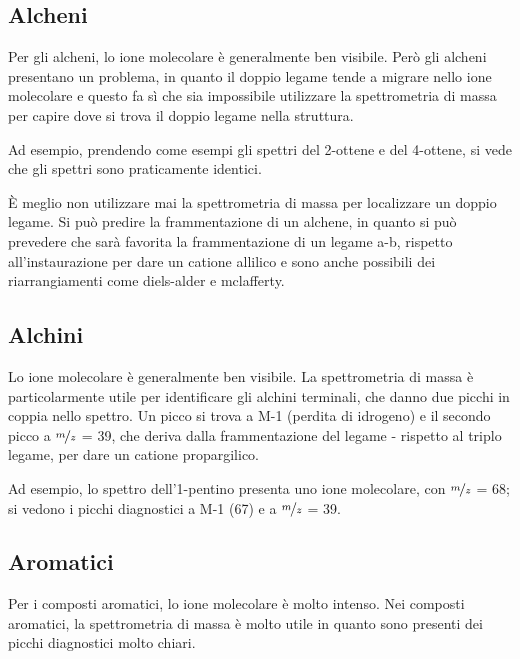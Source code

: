 \subsection{Alcheni}

Per gli alcheni, lo ione molecolare è generalmente ben visibile. Però
gli alcheni presentano un problema, in quanto il doppio legame tende a
migrare nello ione molecolare e questo fa sì che sia impossibile
utilizzare la spettrometria di massa per capire dove si trova il doppio
legame nella struttura.

Ad esempio, prendendo come esempi gli spettri del 2-ottene e del
4-ottene, si vede che gli spettri sono praticamente identici.

È meglio non utilizzare mai la spettrometria di massa per localizzare un
doppio legame. Si può predire la frammentazione di un alchene, in quanto
si può prevedere che sarà favorita la frammentazione di un legame a-b,
rispetto all'instaurazione per dare un catione allilico e sono anche
possibili dei riarrangiamenti come diels-alder e mclafferty.


\subsection{Alchini}

Lo ione molecolare è generalmente ben visibile. La spettrometria di
massa è particolarmente utile per identificare gli alchini terminali,
che danno due picchi in coppia nello spettro. Un picco si trova a M-1
(perdita di idrogeno) e il secondo picco a $\nicefrac{m}{z}$ = 39, che deriva dalla
frammentazione del legame \alpha-\beta{} rispetto al triplo legame, per
dare un catione propargilico.


Ad esempio, lo spettro dell'1-pentino presenta uno ione molecolare, con
$\nicefrac{m}{z}$ = 68; si vedono i picchi diagnostici a M-1 (67) e a $\nicefrac{m}{z}$ = 39.

\subsection{Aromatici}

Per i composti aromatici, lo ione molecolare è molto intenso. Nei
composti aromatici, la spettrometria di massa è molto utile in quanto
sono presenti dei picchi diagnostici molto chiari.

